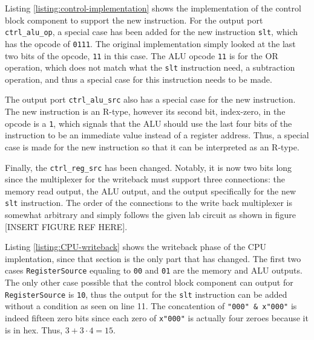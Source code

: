 \documentclass[11pt]{report}
\begin{document}
Listing \ref{listing:control-implementation} shows the implementation of the control block component
to support the new instruction. For the output port \verb|ctrl_alu_op|, a special case has been
added for the new instruction \verb|slt|, which has the opcode of \verb|0111|. The original
implementation simply looked at the last two bits of the opcode, \verb|11| in this case. The ALU
opcode \verb|11| is for the OR operation, which does not match what the \verb|slt| instruction need,
a subtraction operation, and thus a special case for this instruction needs to be made.

The output port \verb|ctrl_alu_src| also has a special case for the new instruction. The new
instruction is an R-type, however its second bit, index-zero, in the opcode is a \verb|1|, which
signals that the ALU should use the last four bits of the instruction to be an immediate value
instead of a register address. Thus, a special case is made for the new instruction so that it can
be interpreted as an R-type.

Finally, the \verb|ctrl_reg_src| has been changed. Notably, it is now two bits long since the
multiplexer for the writeback must support three connections: the memory read output, the ALU
output, and the output specifically for the new \verb|slt| instruction. The order of the connections
to the write back multiplexer is somewhat arbitrary and simply follows the given lab circuit as
shown in figure [INSERT FIGURE REF HERE].

\newpage


Listing \ref{listing:CPU-writeback} shows the writeback phase of the CPU implentation, since that
section is the only part that has changed. The first two cases \verb|RegisterSource| equaling to
\verb|00| and \verb|01| are the memory and ALU outputs. The only other case possible that the
control block component can output for \verb|RegisterSource| is \verb|10|, thus the output for the
\verb|slt| instruction can be added without a condition as seen on line 11. The concatention of
\verb|"000" & x"000"| is indeed fifteen zero bits since each zero of \verb|x"000"| is actually four
zeroes because it is in hex. Thus, $3 + 3 \cdot 4 = 15$.
\end{document}
